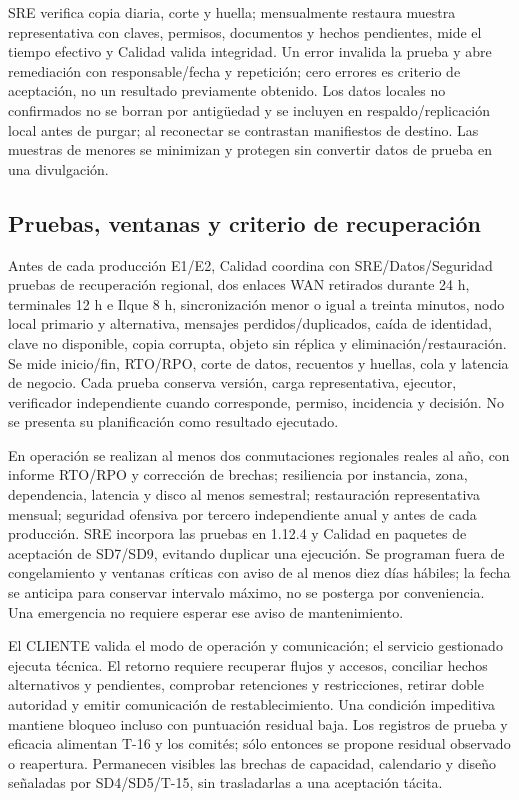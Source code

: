 SRE verifica copia diaria, corte y huella; mensualmente restaura muestra representativa con claves, permisos, documentos y hechos pendientes, mide el tiempo efectivo y Calidad valida integridad. Un error invalida la prueba y abre remediación con responsable/fecha y repetición; cero errores es criterio de aceptación, no un resultado previamente obtenido. Los datos locales no confirmados no se borran por antigüedad y se incluyen en respaldo/replicación local antes de purgar; al reconectar se contrastan manifiestos de destino. Las muestras de menores se minimizan y protegen sin convertir datos de prueba en una divulgación.

\subsection{Pruebas, ventanas y criterio de recuperación}\label{sec:sd8-pruebas-continuidad}
Antes de cada producción E1/E2, Calidad coordina con SRE/Datos/Seguridad pruebas de recuperación regional, dos enlaces WAN retirados durante 24 h, terminales 12 h e Ilque 8 h, sincronización menor o igual a treinta minutos, nodo local primario y alternativa, mensajes perdidos/duplicados, caída de identidad, clave no disponible, copia corrupta, objeto sin réplica y eliminación/restauración. Se mide inicio/fin, RTO/RPO, corte de datos, recuentos y huellas, cola y latencia de negocio. Cada prueba conserva versión, carga representativa, ejecutor, verificador independiente cuando corresponde, permiso, incidencia y decisión. No se presenta su planificación como resultado ejecutado.

En operación se realizan al menos dos conmutaciones regionales reales al año, con informe RTO/RPO y corrección de brechas; resiliencia por instancia, zona, dependencia, latencia y disco al menos semestral; restauración representativa mensual; seguridad ofensiva por tercero independiente anual y antes de cada producción. SRE incorpora las pruebas en 1.12.4 y Calidad en paquetes de aceptación de SD7/SD9, evitando duplicar una ejecución. Se programan fuera de congelamiento y ventanas críticas con aviso de al menos diez días hábiles; la fecha se anticipa para conservar intervalo máximo, no se posterga por conveniencia. Una emergencia no requiere esperar ese aviso de mantenimiento. \parencites[arts.~20 y 21.3; pp.~14--16]{sd8-ba}[RT-07.07/12; RT-10.05--07; RT-11.20; cap.~20; pp.~17--18, 22, 24, 34--35]{sd8-bt}

El CLIENTE valida el modo de operación y comunicación; el servicio gestionado ejecuta técnica. El retorno requiere recuperar flujos y accesos, conciliar hechos alternativos y pendientes, comprobar retenciones y restricciones, retirar doble autoridad y emitir comunicación de restablecimiento. Una condición impeditiva mantiene bloqueo incluso con puntuación residual baja. Los registros de prueba y eficacia alimentan T-16 y los comités; sólo entonces se propone residual observado o reapertura. Permanecen visibles las brechas de capacidad, calendario y diseño señaladas por SD4/SD5/T-15, sin trasladarlas a una aceptación tácita.
